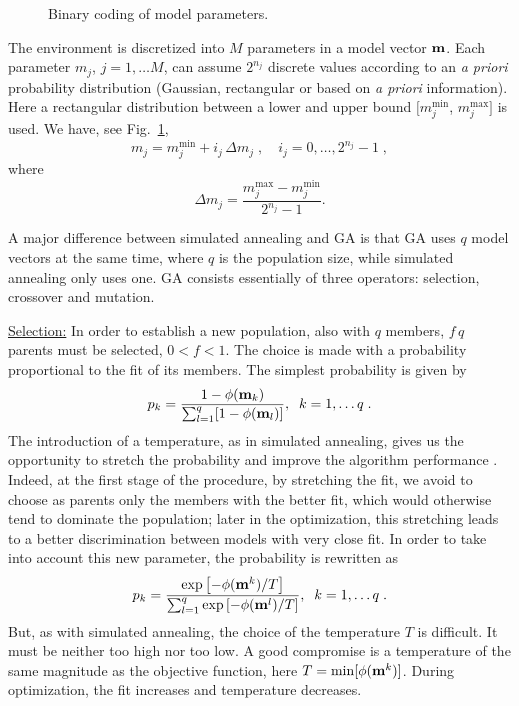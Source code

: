 \documentclass{saclantc}
\begin{document}
\begin{figure}
\epsfxsize=11cm
\centerline{}
\caption{Binary coding of model parameters.}
\label{fig:CODE}
\end{figure}

The environment is discretized into $M$ parameters in a model vector $\bf m$.
Each parameter $m_j$, $ j=1, \ldots M$, can assume $2^{n_j}$ discrete
values according to  an {\it  a priori} probability distribution (Gaussian,
rectangular or based on {\it a priori } information). Here a
rectangular distribution between a lower and upper bound
 $[m_j^{\min}$, $ m_j^{\max}]$ is used. We have, see Fig.~\ref{fig:CODE}, 
\begin{equation}
 m_{j}=m^{\min}_j +i_j \, \Delta m_j
               \;,  \,\;\;\;i_j=0,\ldots,2^{n_j} -1\;,
\label{eq:disc}
\end{equation} 
where 
\begin{equation}
 \Delta m_j= \frac{m^{\max}_j-m^{\min}_j}{2^{n_j}-1}.
\end{equation}

A major difference between simulated annealing and GA is that GA 
uses $ q$ model vectors at the same time, where $q $ is the
population size, while simulated annealing only uses one. GA consists
essentially of three operators: selection, crossover and mutation.

\underline{Selection:} In order to establish a new population, also
with $q$ members, $f \, q $ parents must be selected, $ 0 < f <1$. The
choice is made with a probability proportional to the fit of its
members. The simplest probability is given by 
\begin{equation} 
p_k =
\frac{1-\phi ({\bf m}_k)}{\sum_{l=1}^q [1-\phi ({\bf m}_l)]}, \;\;
k=1,\ldots q \; .
\label{eq:sel}
\end{equation}
The introduction of a temperature, as in simulated annealing, gives us
the opportunity to stretch the probability and improve the
 algorithm performance \cite{stoffa:g91}. Indeed, at the first
stage of the procedure, by stretching the fit, we avoid to choose
as parents only the members with the better fit, which would otherwise
tend to dominate the population; later in the optimization, this
stretching leads to a better discrimination between models with very
close fit. In order to take into account this new parameter, the
probability is rewritten as
\begin{equation}
p_k = \frac{\exp \left[ -\phi ({\bf m}^k)/T \right]}{\sum_{l=1}^q 
\exp  \left[-\phi ({\bf m}^l)/T \right]}, \;\; k=1,\ldots q\; .
\label{eq:bol}
\end{equation}         
But, as with simulated annealing, the choice of the temperature $T$ is
difficult.  It must be neither too high nor too low.  A good compromise
is a temperature of the same magnitude as the objective function, here
$ T = \min [\phi ( {\bf m}^k ) ]$.  During optimization,
the fit increases and temperature decreases.
\end{document}
